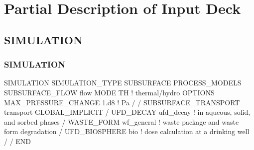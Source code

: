 \documentclass{beamer}
\newcommand\bluecomment[1]{{{\color{blue} #1}}}
\begin{document}

\section{Partial Description of Input Deck}

\subsection{SIMULATION}

\begin{frame}[fragile]\frametitle{SIMULATION}

\begin{semiverbatim}\small
SIMULATION
  SIMULATION_TYPE SUBSURFACE
  PROCESS_MODELS
    SUBSURFACE_FLOW flow
      MODE TH \bluecomment{! thermal/hydro}
      OPTIONS
        MAX_PRESSURE_CHANGE 1.d8 \bluecomment{! Pa}
      /   
    /   
    SUBSURFACE_TRANSPORT transport
      GLOBAL_IMPLICIT
    /
    UFD_DECAY ufd_decay \bluecomment{! in aqueous, solid, and sorbed phases}
    /
    WASTE_FORM wf_general \bluecomment{! waste package and waste form degradation}
    /
    UFD_BIOSPHERE bio \bluecomment{! dose calculation at a drinking well}
    /
  /
END
\end{semiverbatim}

\end{frame}
\end{document}
